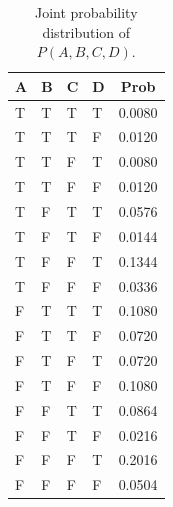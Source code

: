 \documentclass[12pt]{article}
\begin{document}
\begin{table}[!h]
	\centering
	\begin{tabular}{llllc}
		\toprule
		A & B & C & D & Prob   \\
		\midrule
		T & T & T & T & 0.0080 \\
		T & T & T & F & 0.0120 \\
		T & T & F & T & 0.0080 \\
		T & T & F & F & 0.0120 \\
		T & F & T & T & 0.0576 \\
		T & F & T & F & 0.0144 \\
		T & F & F & T & 0.1344 \\
		T & F & F & F & 0.0336 \\
		F & T & T & T & 0.1080 \\
		F & T & T & F & 0.0720 \\
		F & T & F & T & 0.0720 \\
		F & T & F & F & 0.1080 \\
		F & F & T & T & 0.0864 \\
		F & F & T & F & 0.0216 \\
		F & F & F & T & 0.2016 \\
		F & F & F & F & 0.0504 \\
		\bottomrule
		\hline
	\end{tabular}
	\caption{Joint probability distribution of $P(A, B, C, D)$.}
	\label{tab:joint_distribution}
\end{table}
\end{document}
